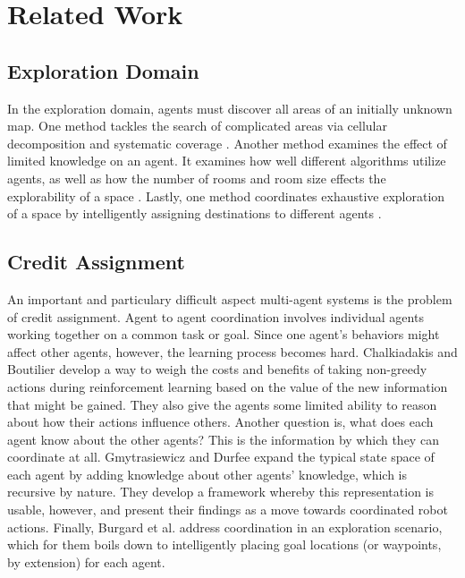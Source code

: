 \documentclass[letterpaper, 10 pt, conference]{ieeeconf}  %
\begin{document}
\section{Related Work}

\subsection{Exploration Domain}
In the exploration domain, agents must discover all areas of an
initially unknown map. One method tackles the search of complicated
areas via cellular decomposition and systematic coverage \cite{choset2001coverage}. Another
method examines the effect of limited knowledge on an agent. It
examines how well different algorithms utilize agents, as well as how
the number of rooms and room size effects the explorability of a space
\cite{ferranti2007brick}. Lastly, one method coordinates exhaustive exploration of a space
by intelligently assigning destinations to different agents \cite{burgard2005coordinated}.

\subsection{Credit Assignment}
An important and particulary difficult aspect multi-agent systems is the problem of
credit assignment. Agent to agent coordination involves individual
agents working together on a common task or goal. Since one agent’s
behaviors might affect other agents, however, the learning process
becomes hard. Chalkiadakis and Boutilier \cite{chalkiadakis2003coordination} develop a way to weigh
the costs and benefits of taking non-greedy actions during
reinforcement learning based on the value of the new information that
might be gained. They also give the agents some limited ability to
reason about how their actions influence others. Another question is,
what does each agent know about the other agents? This is the
information by which they can coordinate at all. Gmytrasiewicz and
Durfee \cite{gmytrasiewicz2000rational} expand the typical state space of each agent by adding
knowledge about other agents’ knowledge, which is recursive by
nature. They develop a framework whereby this representation is
usable, however, and present their findings as a move towards
coordinated robot actions. Finally, Burgard et al. \cite{burgard2005coordinated} address
coordination in an exploration scenario, which for them boils down to
intelligently placing goal locations (or waypoints, by extension) for
each agent.
\end{document}
